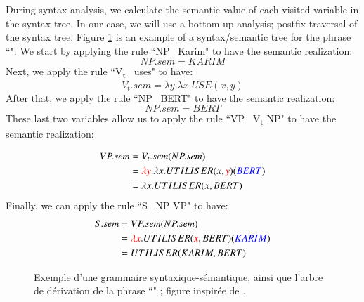 \documentclass{KBook}
\begin{document}
During syntax analysis, we calculate the semantic value of each visited variable in the syntax tree.
In our case, we will use a bottom-up analysis; postfix traversal of the syntax tree.
Figure \ref{fig:arbre-sem1} is an example of a syntax/semantic tree for the phrase ``".
We start by applying the rule ``NP \textrightarrow\ Karim" to have the semantic realization:
\[NP.sem = KARIM\]
Next, we apply the rule ``V\textsubscript{t} \textrightarrow\ uses" to have:
\[V_t.sem = \lambda y.\lambda x.USE(x, y)\]
After that, we apply the rule ``NP \textrightarrow\ BERT" to have the semantic realization:
\[NP.sem = BERT\]
These last two variables allow us to apply the rule ``VP \textrightarrow\ V\textsubscript{t} NP" to have the semantic realization:

\begin{align*}
 VP.sem & = V_t.sem(NP.sem) \\
        & = \textcolor{red}{\lambda y}.\lambda x.UTILISER(x, \textcolor{red}{y})(\textcolor{blue}{BERT})\\
        & = \lambda x.UTILISER(x, BERT)
\end{align*}
Finally, we can apply the rule ``S \textrightarrow\ NP VP" to have:
\begin{align*}
S.sem & = VP.sem(NP.sem) \\
       & = \textcolor{red}{\lambda x}.UTILISER(\textcolor{red}{x}, BERT)(\textcolor{blue}{KARIM})\\
       & = UTILISER(KARIM, BERT)
\end{align*}

\begin{figure}[ht]
	\centering
	\caption[Exemple d'une grammaire syntaxique-sémantique et une dérivation.]{Exemple d'une grammaire syntaxique-sémantique, ainsi que l'arbre de dérivation de la phrase ``" ; figure inspirée de \cite{2018-eisenstein}.}
	\label{fig:arbre-sem1}
\end{figure}
\end{document}
